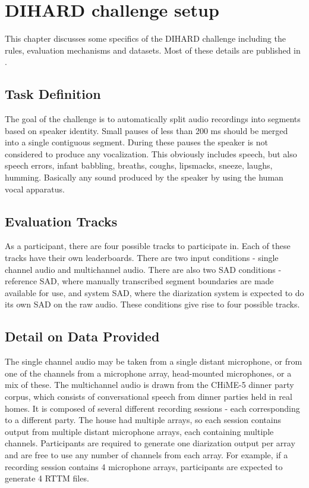 \chapter{DIHARD challenge setup}

This chapter discusses some specifics of the DIHARD challenge including the rules, evaluation mechanisms and datasets. Most of these details are published in \cite{ryant2019second}.

\section{Task Definition}
The goal of the challenge is to automatically split audio recordings into segments based on speaker identity. Small pauses of less than 200 ms should be merged into a single contiguous segment. During these pauses the speaker is not considered to produce any vocalization. This obviously includes speech, but also speech errors, infant babbling, breaths, coughs, lipsmacks, sneeze, laughs, humming. Basically any sound produced by the speaker by using the human vocal apparatus.

\section{Evaluation Tracks}
As a participant, there are four possible tracks to participate in. Each of these tracks have their own leaderboards. There are two input conditions - single channel audio and multichannel audio. There are also two SAD conditions - reference SAD, where manually transcribed segment boundaries are made available for use, and system SAD, where the diarization system is expected to do its own SAD on the raw audio. These conditions give rise to four possible tracks.

\section{Detail on Data Provided}

The single channel audio may be taken from a single distant microphone, or from one of the channels from a microphone array, head-mounted microphones, or a mix of these. The multichannel audio is drawn from the CHiME-5 dinner party corpus, which consists of conversational speech from dinner parties held in real homes. It is composed of several different recording sessions - each corresponding to a different party. The house had multiple arrays, so each session contains output from multiple distant microphone arrays, each containing multiple channels. Participants are required to generate one diarization output per array and are free to use any number of channels from each array. For example, if a recording session contains 4 microphone arrays, participants are expected to generate 4 RTTM files.

